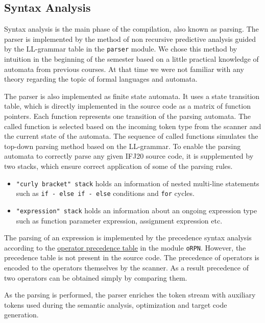 \documentclass[12pt]{article}
\begin{document}
\subsection{Syntax Analysis}
\label{sec:syntaxanalyser}
Syntax analysis is the main phase of the compilation, also known as parsing. The parser is implemented by the method of non recursive predictive analysis guided by the LL-grammar table in the \texttt{parser} module. We chose this method by intuition in the beginning of the semester based on a little practical knowledge of automata from previous courses. At that time we were not familiar with any theory regarding the topic of formal languages and automata. \par
	The parser is also implemented as finite state automata. It uses a state transition table, which is directly implemented in the source code as a matrix of function pointers. Each function represents one transition of the parsing automata. The called function is selected based on the incoming token type from the scanner and the current state of the automata. The sequence of called functions simulates the top-down parsing method based on the LL-grammar. To enable the parsing automata to correctly parse any given IFJ20 source code, it is supplemented by two stacks, which ensure correct application of some of the parsing rules.
	\begin{itemize}
	\item \texttt{"curly bracket" stack} holds an information of nested multi-line statements such as \texttt{if - else if - else} conditions and \texttt{for} cycles.
	\item \texttt{"expression" stack} holds an information about an ongoing expression type such as function parameter expression, assignment expression etc.
 \end{itemize}
	The parsing of an expression is implemented by the precedence syntax analysis according to the \hyperref[sec:prectable]{operator precedence table} in the module \texttt{oRPN}. However, the precedence table is not present in the source code. The precedence of operators is encoded to the operators themselves by the scanner. As a result precedence of two operators can be obtained simply by comparing them. \par
 As the parsing is performed, the parser enriches the token stream with auxiliary tokens used during the semantic analysis, optimization and target code generation.
	
\end{document}
